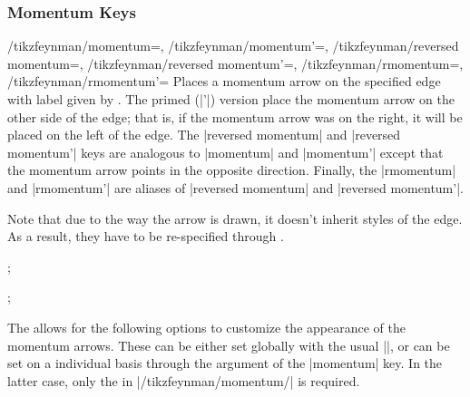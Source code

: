 \documentclass[a4paper,final]{ltxdoc}
\begin{document}
\subsubsection{Momentum Keys}
\label{subsubsec:momentum_keys}

\begin{keylist}{%
    /tikzfeynman/momentum=,
    /tikzfeynman/momentum'=,
    /tikzfeynman/reversed momentum=,
    /tikzfeynman/reversed momentum'=,
    /tikzfeynman/rmomentum=,
    /tikzfeynman/rmomentum'=}
  Places a momentum arrow on the specified edge with label given by .
  The primed (|'|) version place the momentum arrow on the other side of the
  edge; that is, if the momentum arrow was on the right, it will be placed on
  the left of the edge.  The |reversed momentum| and |reversed momentum'| keys
  are analogous to |momentum| and |momentum'| except that the momentum arrow
  points in the opposite direction.  Finally, the |rmomentum| and |rmomentum'|
  are aliases of |reversed momentum| and |reversed momentum'|.

  Note that due to the way the arrow is drawn, it doesn't inherit styles of the
  edge.  As a result, they have to be re-specified through .

\begin{codeexample}[]
;
\end{codeexample}

\begin{codeexample}[]
;
\end{codeexample}

The  allows for the following options to customize the appearance
of the momentum arrows.  These can be either set globally with the usual
|\tikzfeynmanset|, or can be set on a individual basis through the
 argument of the |momentum| key.  In the latter case, only the
 in |/tikzfeynman/momentum/| is required.


\end{keylist}
\end{document}
